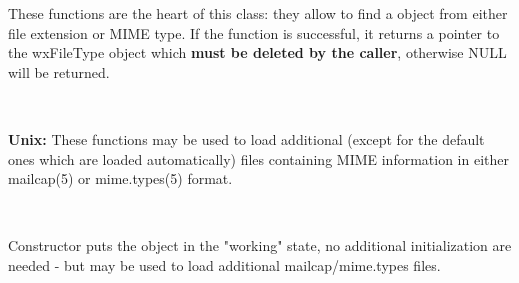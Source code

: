
These functions are the heart of this class: they allow to find a 
 object from either file extension or MIME type.
If the function is successful, it returns a pointer to the wxFileType object
which {\bf must be deleted by the caller}, otherwise NULL will be returned.

\\


{\bf Unix:} These functions may be used to load additional (except for the
default ones which are loaded automatically) files containing MIME
information in either mailcap(5) or mime.types(5) format.

\\


\label{wxmimetypesmanagerctor}

Constructor puts the object in the "working" state, no additional initialization
are needed - but  may be used to load
additional mailcap/mime.types files.

